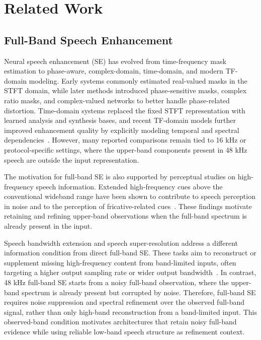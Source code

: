 \chapter{Related Work}
\label{chap:related_work}

\section{Full-Band Speech Enhancement}
\label{sec:related_observed_band_gap}

Neural speech enhancement (SE) has evolved from time-frequency mask estimation to phase-aware, complex-domain, time-domain, and modern TF-domain modeling. Early systems commonly estimated real-valued masks in the STFT domain, while later methods introduced phase-sensitive masks, complex ratio masks, and complex-valued networks to better handle phase-related distortion. Time-domain systems replaced the fixed STFT representation with learned analysis and synthesis bases, and recent TF-domain models further improved enhancement quality by explicitly modeling temporal and spectral dependencies~\cite{erdogan2015psm,williamson2016cirm,hu2020dccrn,luo2019convtasnet,cao2022cmgan,lu2023mpsenet,saijo2024tflocoformer}. However, many reported comparisons remain tied to 16 kHz or protocol-specific settings, where the upper-band components present in 48 kHz speech are outside the input representation.

The motivation for full-band SE is also supported by perceptual studies on high-frequency speech information. Extended high-frequency cues above the conventional wideband range have been shown to contribute to speech perception in noise and to the perception of fricative-related cues~\cite{stelmachowicz2001,monson2014,moore2016}. These findings motivate retaining and refining upper-band observations when the full-band spectrum is already present in the input.

Speech bandwidth extension and speech super-resolution address a different information condition from direct full-band SE. These tasks aim to reconstruct or supplement missing high-frequency content from band-limited inputs, often targeting a higher output sampling rate or wider output bandwidth~\cite{liu2022voicefixer,andreev2022hifiplusplus,audiosr}. In contrast, 48 kHz full-band SE starts from a noisy full-band observation, where the upper-band spectrum is already present but corrupted by noise. Therefore, full-band SE requires noise suppression and spectral refinement over the observed full-band signal, rather than only high-band reconstruction from a band-limited input. This observed-band condition motivates architectures that retain noisy full-band evidence while using reliable low-band speech structure as refinement context.

